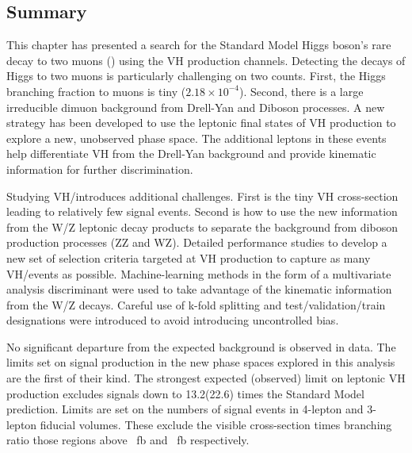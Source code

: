 \subsection{Summary}

This chapter has presented a search for the Standard Model Higgs boson's rare decay to two muons (\hmm) using the VH production channels.
Detecting the decays of Higgs to two muons is particularly challenging on two counts.
First, the Higgs branching fraction to muons is tiny ($2.18\times10^{-4}$).
Second, there is a large irreducible dimuon background from Drell-Yan and Diboson processes.
A new strategy has been developed to use the leptonic final states of VH production to explore a new, unobserved phase space.
The additional leptons in these events help differentiate VH from the Drell-Yan background and provide kinematic information for further discrimination.

Studying VH/\hmm introduces additional challenges.
First is the tiny VH cross-section leading to relatively few signal events.
Second is how to use the new information from the W/Z leptonic decay products to separate the background from diboson production processes (ZZ and WZ).
Detailed performance studies to develop a new set of selection criteria targeted at VH production to capture as many VH/\hmm events as possible.
Machine-learning methods in the form of a multivariate analysis discriminant were used to take advantage of the kinematic information from the W/Z decays.
Careful use of k-fold splitting and test/validation/train designations were introduced to avoid introducing uncontrolled bias.

No significant departure from the expected background is observed in data.
The limits set on signal production in the new phase spaces explored in this analysis are the first of their kind.
The strongest expected (observed) limit on leptonic VH production excludes signals down to 13.2(22.6) times the Standard Model prediction.
Limits are set on the numbers of signal events in 4-lepton and 3-lepton fiducial volumes.
These exclude the visible cross-section times branching ratio those regions above ~fb and ~fb respectively.

